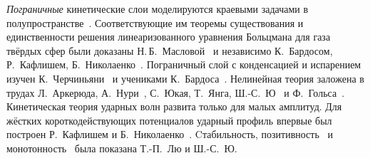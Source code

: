 

\emph{Пограничные} кинетические слои моделируются краевыми задачами в полупространстве~\autocite{Grad1969}.
Соответствующие им теоремы существования и единственности решения линеаризованного уравнения Больцмана для газа твёрдых сфер
были доказаны Н.\,Б.~Масловой~\autocite{Maslova1982} и независимо К.~Бардосом, Р.~Кафлишем, Б.~Николаенко~\autocite{Bardos1986}.
Пограничный слой с конденсацией и испарением изучен К.~Черчиньяни~\autocite{Cercignani1986}
и учениками К.~Бардоса~\autocite{Coron1988}.
Нелинейная теория заложена в трудах Л.~Аркерюда, А.~Нури~\autocite{Arkeryd2000},
С.~Юкая, Т.~Янга, Ш.-С.~Ю~\autocite{Ukai2003} и Ф.~Гольса~\autocite{Golse2008}.
Кинетическая теория ударных волн развита только для малых амплитуд.
Для жёстких короткодействующих потенциалов ударный профиль впервые был построен Р.~Кафлишем и Б.~Николаенко~\autocite{Caflisch1982}.
Cтабильность, позитивность~\autocite{Liu2004} и монотонность~\autocite{Liu2013} была показана Т.-П.~Лю и Ш.-С.~Ю.




